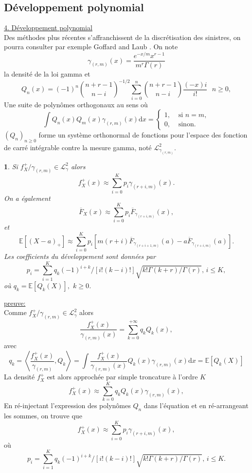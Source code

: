 \documentclass[8pt,notheorems]{beamer}
\newtheorem{prop}{\translate{Proposition}}
\theoremstyle{definition}
\theoremstyle{example}
\theoremstyle{mystyle}
\theoremstyle{plain}
\begin{document}
\subsection{Développement polynomial}
\begin{frame}[allowframebreaks]

\underline{4. Développement polynomial}\\
Des méthodes plus récentes s'affranchissent de la discrétisation des sinistres, on pourra consulter par exemple Goffard and Laub \cite{Goffard2020}. On note 
$$
\gamma_{(r,m)}(x) = \frac{e^{-x/m}x^{r-1}}{m^r\Gamma(r)}
$$
la densité de la loi gamma et 
$$
Q_n(x) = (-1)^n\binom{n+r-1}{n-i}^{-1/2}\sum_{i=0}^{n}\binom{n+r-1}{n-i}\frac{(-x)i}{i!}\text{ }n\geq0,
$$ 
Une suite de polynômes orthogonaux au sens où
$$
\int Q_n(x)Q_m(x)\gamma_{(r,m)}(x)\text{d}x = \begin{cases}
1,&\text{ si }n=m,\\
0, &\text{ sinon.}
\end{cases}
$$
$(Q_n)_{n\geq0}$ forme un système orthonormal de fonctions pour l'espace des fonction de carré intégrable contre la mesure gamma, noté $\mathcal{L}^2_{\gamma_{(r,m)}}$. 
\begin{prop}
Si $f_X^+ / \gamma_{(r,m)}\in \mathcal{L}^2_\gamma$ alors 
$$
f_X^+(x) \approx \sum_{i = 0}^{K}p_i\gamma_{(r+i,m)}(x).  
$$ 
On a également 
$$
\overline{F}_X(x) \approx \sum_{i = 0}^{K}p_i\overline{F}_{\gamma_{(r+i,m)}}(x),  
$$ 
et 
$$
\mathbb{E}[(X-a)_+] \approx \sum_{i = 0}^{K}p_i[m(r+i)\overline{F}_{\gamma_{(r+i+1,m)}}(a)-a\overline{F}_{\gamma_{(r+i,m)}}(a)].  
$$ 
Les coefficients du développement sont données par 
$$
p_i = \sum_{i = 1}^Kq_k(-1)^{i+k}/[i!(k-i)!]\sqrt{k!\Gamma(k+r)/\Gamma(r)}\text{, }i\leq K,
$$
où $q_k =\mathbb{E}[Q_k(X)],$ $k\geq0$.
\end{prop}
\underline{preuve:}\\
Comme $f_X^+ / \gamma_{(r,m)}\in \mathcal{L}^2_\gamma$ alors 
$$
\frac{f_X^+(x)}{\gamma_{(r,m)}(x)} = \sum_{k = 0}^{+\infty}q_kQ_k(x), 
$$
avec 
$$
q_k = \left<\frac{f_X^+(x)}{\gamma_{(r,m)}}, Q_k\right> = \int \frac{f_X^+(x)}{\gamma_{(r,m)}(x)}Q_k(x)\gamma_{(r,m)}(x)\text{d}x = \mathbb{E}[Q_k(X)]
$$
La densité $f_X^+$ est alors approchée par simple troncature à l'ordre $K$
$$
f_X^+(x) \approx \sum_{k = 0}^{K}q_kQ_k(x)\gamma_{(r,m)}(x), 
$$
En ré-injectant l'expression des polynômes $Q_n$ dans l'équation et en ré-arrangeant les sommes, on trouve que 
$$
f_X^+(x) \approx \sum_{i = 0}^{K}p_i\gamma_{(r+i,m)}(x), 
$$
où
$$
p_i = \sum_{i = 1}^Kq_k(-1)^{i+k}/[i!(k-i)!]\sqrt{k!\Gamma(k+r)/\Gamma(r)}\text{, }i\leq K. 
$$
\end{frame}
\end{document}
